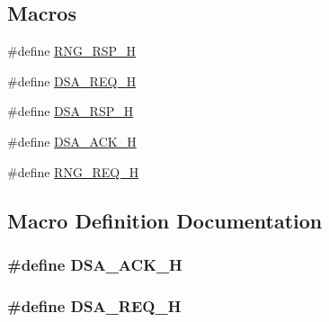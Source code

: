 \subsection*{Macros}
\begin{DoxyCompactItemize}
\item 
\#define \hyperlink{mac-messages_8h_abaeedd9bf95e018537dae11f1d55973c}{R\+N\+G\+\_\+\+R\+S\+P\+\_\+H}
\item 
\#define \hyperlink{mac-messages_8h_a0b45a4824089225efb2d915fd88fb6a8}{D\+S\+A\+\_\+\+R\+E\+Q\+\_\+H}
\item 
\#define \hyperlink{mac-messages_8h_ac5a37bea6fb126a5cf94ab8a67d5d63e}{D\+S\+A\+\_\+\+R\+S\+P\+\_\+H}
\item 
\#define \hyperlink{mac-messages_8h_ab91d72459c989dcbba2c21cfa2b5a0ec}{D\+S\+A\+\_\+\+A\+C\+K\+\_\+H}
\item 
\#define \hyperlink{mac-messages_8h_acde3bfbb818c838eccd83010023f9246}{R\+N\+G\+\_\+\+R\+E\+Q\+\_\+H}
\end{DoxyCompactItemize}


\subsection{Macro Definition Documentation}
\subsubsection[{\texorpdfstring{D\+S\+A\+\_\+\+A\+C\+K\+\_\+H}{DSA_ACK_H}}]{\setlength{\rightskip}{0pt plus 5cm}\#define D\+S\+A\+\_\+\+A\+C\+K\+\_\+H}\hypertarget{mac-messages_8h_ab91d72459c989dcbba2c21cfa2b5a0ec}{}\label{mac-messages_8h_ab91d72459c989dcbba2c21cfa2b5a0ec}
\subsubsection[{\texorpdfstring{D\+S\+A\+\_\+\+R\+E\+Q\+\_\+H}{DSA_REQ_H}}]{\setlength{\rightskip}{0pt plus 5cm}\#define D\+S\+A\+\_\+\+R\+E\+Q\+\_\+H}\hypertarget{mac-messages_8h_a0b45a4824089225efb2d915fd88fb6a8}{}\label{mac-messages_8h_a0b45a4824089225efb2d915fd88fb6a8}
